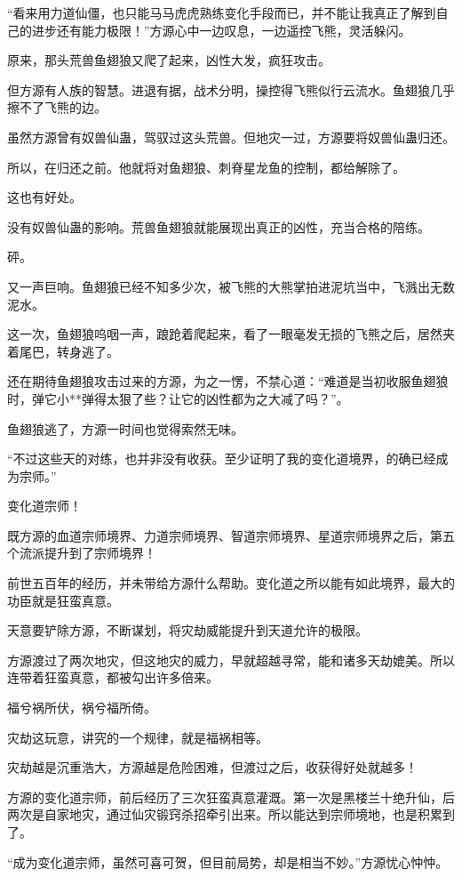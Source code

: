 \begin{this_body}
“看来用力道仙僵，也只能马马虎虎熟练变化手段而已，并不能让我真正了解到自己的进步还有能力极限！”方源心中一边叹息，一边遥控飞熊，灵活躲闪。

原来，那头荒兽鱼翅狼又爬了起来，凶性大发，疯狂攻击。

但方源有人族的智慧。进退有据，战术分明，操控得飞熊似行云流水。鱼翅狼几乎擦不了飞熊的边。

虽然方源曾有奴兽仙蛊，驾驭过这头荒兽。但地灾一过，方源要将奴兽仙蛊归还。

所以，在归还之前。他就将对鱼翅狼、刺脊星龙鱼的控制，都给解除了。

这也有好处。

没有奴兽仙蛊的影响。荒兽鱼翅狼就能展现出真正的凶性，充当合格的陪练。

砰。

又一声巨响。鱼翅狼已经不知多少次，被飞熊的大熊掌拍进泥坑当中，飞溅出无数泥水。

这一次，鱼翅狼呜咽一声，踉跄着爬起来，看了一眼毫发无损的飞熊之后，居然夹着尾巴，转身逃了。

还在期待鱼翅狼攻击过来的方源，为之一愣，不禁心道：“难道是当初收服鱼翅狼时，弹它小**弹得太狠了些？让它的凶性都为之大减了吗？”。

鱼翅狼逃了，方源一时间也觉得索然无味。

“不过这些天的对练，也并非没有收获。至少证明了我的变化道境界，的确已经成为宗师。”

变化道宗师！

既方源的血道宗师境界、力道宗师境界、智道宗师境界、星道宗师境界之后，第五个流派提升到了宗师境界！

前世五百年的经历，并未带给方源什么帮助。变化道之所以能有如此境界，最大的功臣就是狂蛮真意。

天意要铲除方源，不断谋划，将灾劫威能提升到天道允许的极限。

方源渡过了两次地灾，但这地灾的威力，早就超越寻常，能和诸多天劫媲美。所以连带着狂蛮真意，都被勾出许多倍来。

福兮祸所伏，祸兮福所倚。

灾劫这玩意，讲究的一个规律，就是福祸相等。

灾劫越是沉重浩大，方源越是危险困难，但渡过之后，收获得好处就越多！

方源的变化道宗师，前后经历了三次狂蛮真意灌溉。第一次是黑楼兰十绝升仙，后两次是自家地灾，通过仙灾锻窍杀招牵引出来。所以能达到宗师境地，也是积累到了。

“成为变化道宗师，虽然可喜可贺，但目前局势，却是相当不妙。”方源忧心忡忡。


\end{this_body}
